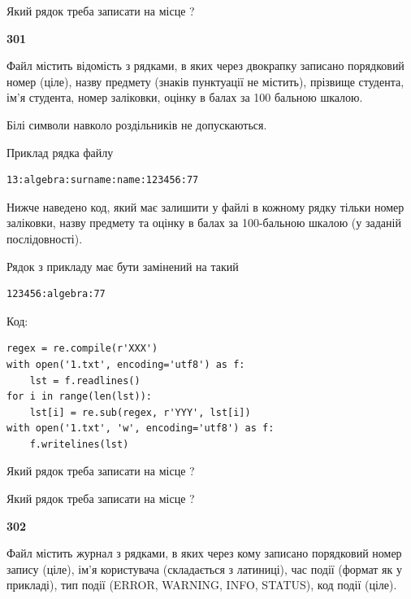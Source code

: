 Який рядок треба записати на місце  ?\par


\newpage

{\begin {center}\textbf{ 301}\end {center}}\par
Файл  містить відомість з рядками, в яких через двокрапку записа\-но поряд\-ковий номер (ціле), назву предмету (знаків пунктуації не містить), прізвище студента, ім'я студента, номер заліковки, оцінку в балах за 100 бальною шкалою.

Білі символи навколо роздільників не допускаються.

Приклад рядка файлу



\begin{verbatim}
13:algebra:surname:name:123456:77
\end{verbatim}


Нижче наведено код, який має залишити у файлі в кожному рядку тільки номер заліковки, назву предмету та оцінку в балах за 100-бальною шкалою (у заданій послі\-дов\-ності).

Рядок з прикладу має бути замінений на такий



\begin{verbatim}
123456:algebra:77
\end{verbatim}




Код:



\begin{verbatim}
regex = re.compile(r'XXX')
with open('1.txt', encoding='utf8') as f:
    lst = f.readlines()
for i in range(len(lst)):
    lst[i] = re.sub(regex, r'YYY', lst[i])
with open('1.txt', 'w', encoding='utf8') as f:
    f.writelines(lst)
\end{verbatim}







Який рядок треба записати на місце  ?\par
\vspace{5mm}


Який рядок треба записати на місце  ?\par


\newpage

{\begin {center}\textbf{ 302}\end {center}}\par
Файл  містить журнал з рядками, в яких через кому записано поряд\-ко\-вий номер запису (ціле), ім'я користувача (складається з латиниці), час події (фор\-мат як у прикладі), тип події (ERROR, WARNING, INFO, STATUS), код події (ціле).

